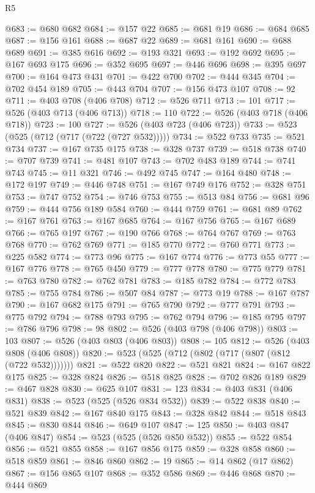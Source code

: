 \begin{lexlean}{R5}
\begin{coremodule}
@683 := @680 @682
@684 := @157 @22
@685 := @681 @19
@686 := @684 @685
@687 := @156 @161
@688 := @687 @22
@689 := @681 @161
@690 := @688 @689
@691 := @385 @616
@692 := @193 @321
@693 := @192 @692
@695 := @167 @693 @175
@696 := @352 @695
@697 := @446 @696
@698 := @395 @697
@700 := @164 @473 @431
@701 := @422 @700
@702 := @444 @345
@704 := @702 @454 @189
@705 := @443 @704
@707 := @156 @473 @107
@708 := 92
@711 := @403 @708 (@406 @708)
@712 := @526 @711
@713 := 101
@717 := @526 (@403 @713 (@406 @713))
@718 := 110
@722 := @526 (@403 @718 (@406 @718))
@723 := 100
@727 := @526 (@403 @723 (@406 @723))
@733 := @523 (@525 (@712 (@717 (@722 (@727 @532)))))
@734 := @522 @733
@735 := @521 @734
@737 := @167 @735 @175
@738 := @328 @737
@739 := @518 @738
@740 := @707 @739
@741 := @481 @107
@743 := @702 @483 @189
@744 := @741 @743
@745 := @11 @321
@746 := @492 @745
@747 := @164 @480
@748 := @172 @197
@749 := @446 @748
@751 := @167 @749 @176
@752 := @328 @751
@753 := @747 @752
@754 := @746 @753
@755 := @513 @84
@756 := @681 @96
@759 := @444 @756 @189 @584
@760 := @444 @759
@761 := @681 @89
@762 := @167 @761
@763 := @167 @685
@764 := @167 @756
@765 := @167 @689
@766 := @765 @197
@767 := @190 @766
@768 := @764 @767
@769 := @763 @768
@770 := @762 @769
@771 := @185 @770
@772 := @760 @771
@773 := @225 @582
@774 := @773 @96
@775 := @167 @774
@776 := @773 @55
@777 := @167 @776
@778 := @765 @450
@779 := @777 @778
@780 := @775 @779
@781 := @763 @780
@782 := @762 @781
@783 := @185 @782
@784 := @772 @783
@785 := @755 @784
@786 := @507 @84
@787 := @773 @19
@788 := @167 @787
@790 := @167 @682 @175
@791 := @765 @790
@792 := @777 @791
@793 := @775 @792
@794 := @788 @793
@795 := @762 @794
@796 := @185 @795
@797 := @786 @796
@798 := 98
@802 := @526 (@403 @798 (@406 @798))
@803 := 103
@807 := @526 (@403 @803 (@406 @803))
@808 := 105
@812 := @526 (@403 @808 (@406 @808))
@820 := @523 (@525 (@712 (@802 (@717 (@807 (@812 (@722 @532)))))))
@821 := @522 @820
@822 := @521 @821
@824 := @167 @822 @175
@825 := @328 @824
@826 := @518 @825
@828 := @702 @826 @189
@829 := @467 @828
@830 := @625 @107
@831 := 123
@834 := @403 @831 (@406 @831)
@838 := @523 (@525 (@526 @834 @532))
@839 := @522 @838
@840 := @521 @839
@842 := @167 @840 @175
@843 := @328 @842
@844 := @518 @843
@845 := @830 @844
@846 := @649 @107
@847 := 125
@850 := @403 @847 (@406 @847)
@854 := @523 (@525 (@526 @850 @532))
@855 := @522 @854
@856 := @521 @855
@858 := @167 @856 @175
@859 := @328 @858
@860 := @518 @859
@861 := @846 @860
@862 := 19
@865 := @14 @862 (@17 @862)
@867 := @156 @865 @107
@868 := @352 @586
@869 := @446 @868
@870 := @444 @869

\end{coremodule}
\end{lexlean}
